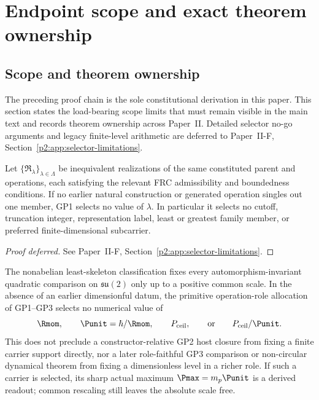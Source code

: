 \documentclass[12pt,a4paper]{article}
\begin{document}
\section{Endpoint scope and exact theorem ownership}
\label{paper2a:sec:organized-ownership}

\subsection{Scope and theorem ownership}
\label{p2:sec:ownership-boundary}

The preceding proof chain is the sole constitutional derivation in this paper.
This section states the load-bearing scope limits that must remain visible in
the main text and records theorem ownership across Paper~II.  Detailed selector
no-go arguments and legacy finite-level arithmetic are deferred to
Paper~II-F, Section~\ref{p2:app:selector-limitations}.

\begin{theorem}
\label{p2:thm:no-cutoff-from-finiteness}
Let \(\{\mathfrak R_\lambda\}_{\lambda\in\Lambda}\) be inequivalent
realizations of the same constituted parent and operations, each satisfying
the relevant FRC admissibility and boundedness conditions.  If no earlier natural construction
or generated operation singles out one member, GP1 selects no value of
\(\lambda\).  In particular it selects no cutoff, truncation integer,
representation label, least or greatest family member, or preferred
finite-dimensional subcarrier.
\end{theorem}

\begin{proof}[Proof deferred]
See Paper~II-F, Section~\ref{p2:app:selector-limitations}.
\end{proof}

\begin{corollary}
\label{p2:cor:no-numerical-scale-from-gp1-gp2}
The nonabelian least-skeleton classification fixes every
automorphism-invariant quadratic
comparison on \(\mathfrak{su}(2)\) only up to a positive common scale.  In the
absence of an earlier dimensionful datum, the primitive operation-role
allocation of GP1--GP3 selects no numerical value of
\[
 \Rmom,\qquad \Punit=\hbar/\Rmom,\qquad P_{\rm ceil},
 \qquad\text{or}\qquad P_{\rm ceil}/\Punit .
\]
This does not preclude a constructor-relative GP2 host closure from fixing a
finite carrier support directly, nor a later role-faithful GP3 comparison or
non-circular dynamical theorem from fixing a dimensionless level in a richer
role.  If such a carrier is selected, its sharp
actual maximum \(\Pmax=m_p\Punit\) is a derived readout; common rescaling still
leaves the absolute scale free.
\end{corollary}
\end{document}

